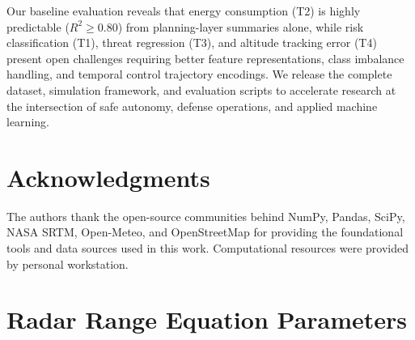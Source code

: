 \documentclass{article}
\begin{document}
Our baseline evaluation reveals that energy consumption (T2) is highly
predictable ($R^2 \geq 0.80$) from planning-layer summaries alone, while
risk classification (T1), threat regression (T3), and altitude tracking
error (T4) present open challenges requiring better feature representations,
class imbalance handling, and temporal control trajectory encodings.
We release the complete dataset, simulation framework, and evaluation
scripts to accelerate research at the intersection of safe autonomy,
defense operations, and applied machine learning.

\section*{Acknowledgments}

The authors thank the open-source communities behind NumPy, Pandas, SciPy,
NASA SRTM, Open-Meteo, and OpenStreetMap for providing the foundational
tools and data sources used in this work. Computational resources were
provided by personal workstation.




\appendix

\section{Radar Range Equation Parameters}
\label{app:rre_params}
\end{document}
